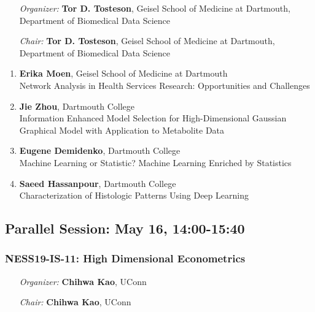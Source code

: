 \begin{enumerate}[align=left]
\item [\emph{Organizer:}] \textbf{Tor D. Tosteson}, Geisel School of Medicine at Dartmouth, Department of Biomedical Data Science \\
\item [\emph{Chair:}] \textbf{Tor D. Tosteson}, Geisel School of Medicine at Dartmouth, Department of Biomedical Data Science
\end{enumerate}

\begin{enumerate}
\item \textbf{Erika Moen}, Geisel School of Medicine at Dartmouth \\
Network Analysis in Health Services Research: Opportunities and Challenges
\item \textbf{Jie Zhou}, Dartmouth College \\
Information Enhanced Model Selection for High-Dimensional Gaussian Graphical Model with Application to Metabolite Data
\item \textbf{Eugene Demidenko}, Dartmouth College \\
Machine Learning or Statistic? Machine Learning Enriched by Statistics
\item \textbf{Saeed Hassanpour}, Dartmouth College \\
Characterization of Histologic Patterns Using Deep Learning
\end{enumerate}

\subsection*{Parallel Session: May 16, 14:00-15:40}

\subsubsection*{NESS19-IS-11: High Dimensional Econometrics}

\begin{enumerate}[align=left]
\item [\emph{Organizer:}] \textbf{Chihwa Kao}, UConn \\
\item [\emph{Chair:}] \textbf{Chihwa Kao}, UConn
\end{enumerate}

